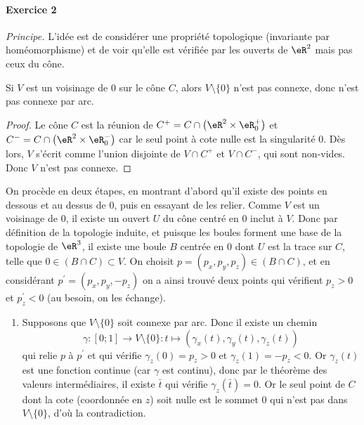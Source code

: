  \paragraph{Exercice 2}
 \emph{Principe.} L'idée est de considérer une propriété topologique
 (invariante par homéomorphisme) et de voir qu'elle est vérifiée par
 les ouverts de $\eR^2$ mais pas ceux du cône.

 \begin{lemma}Si $V$ est un voisinage de $0$ sur le cône $C$, alors
   $V\setminus\{0\}$ n'est pas connexe, donc n'est pas connexe par
   arc.\end{lemma}
 \begin{proof}Le cône $C$ est la réunion de $C^+ = C \cap
   \left(\eR^2\times \eR_0^+\right)$ et $C^- = C \cap \left(\eR^2\times
     \eR_0^-\right)$ car le seul point à cote nulle est la singularité
   $0$. Dès lors, $V$ s'écrit comme l'union disjointe de $V\cap C^+$
   et $V\cap C^-$, qui sont non-vides. Donc $V$ n'est pas
   connexe.\end{proof}

On procède en deux étapes, en montrant d'abord qu'il
   existe des points en \og dessous\fg{} et au \og dessus\fg{} de
   $0$, puis en essayant de les relier.
     Comme $V$ est un voisinage de $0$, il existe un ouvert $U$ du
     cône centré en $0$ inclut à $V$. Donc par définition de la
     topologie induite, et puisque les boules forment une base de la
     topologie de $\eR^3$, il existe une boule $B$ centrée en $0$ dont
     $U$ est la trace sur $C$, telle que $0 \in (B \cap C) \subset
     V$. On choisit $p = (p_x,p_y,p_z) \in (B \cap C)$, et en
     considérant $p^\prime = (p_x, p_y, -p_z)$ on a ainsi trouvé deux
     points qui vérifient $p_z > 0$ et $p^\prime_z < 0$ (au besoin,
     on les échange).

   \begin{enumerate}
   \item Supposons que $V\setminus\{0\}$ soit connexe par arc. Donc
     il existe un chemin
     \[\gamma : [0;1] \to V\setminus\{0\} : t \mapsto
     (\gamma_x(t),\gamma_y(t),\gamma_z(t))\] qui relie $p$ à
     $p^\prime$ et qui vérifie $\gamma_z(0) = p_z > 0$ et
     $\gamma_z(1) = -p_z < 0$. Or $\gamma_z(t)$ est une fonction
     continue (car $\gamma$ est continu), donc par le théorème des
     valeurs intermédiaires, il existe $\bar t$ qui vérifie
     $\gamma_z(\bar t) = 0$. Or le seul point de $C$ dont la cote
     (coordonnée en $z$) soit nulle est le sommet $0$ qui n'est pas
     dans $V\setminus\{0\}$, d'où la contradiction.
   \end{enumerate}

